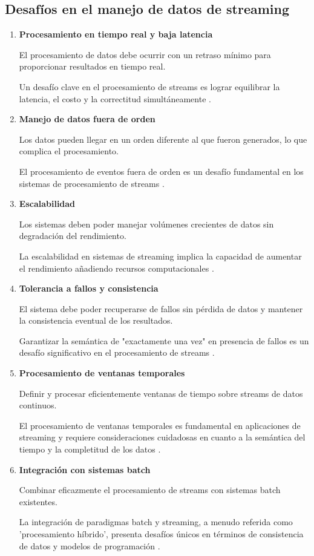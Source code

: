 \subsection{Desafíos en el manejo de datos de streaming}

\begin{enumerate}
    \item \textbf{Procesamiento en tiempo real y baja latencia}
    
    El procesamiento de datos debe ocurrir con un retraso mínimo para proporcionar resultados en tiempo real.
    
    Un desafío clave en el procesamiento de streams es lograr equilibrar la latencia, el costo y la correctitud simultáneamente \parencite{akidau2015dataflow}.

    \item \textbf{Manejo de datos fuera de orden}
    
    Los datos pueden llegar en un orden diferente al que fueron generados, lo que complica el procesamiento.
    
    El procesamiento de eventos fuera de orden es un desafío fundamental en los sistemas de procesamiento de streams \parencite[p.~87]{flink}.

    \item \textbf{Escalabilidad}
    
    Los sistemas deben poder manejar volúmenes crecientes de datos sin degradación del rendimiento.
    
    La escalabilidad en sistemas de streaming implica la capacidad de aumentar el rendimiento añadiendo recursos computacionales \parencite{samurai}.

    \newpage
    \item \textbf{Tolerancia a fallos y consistencia}
    
    El sistema debe poder recuperarse de fallos sin pérdida de datos y mantener la consistencia eventual de los resultados.
    
    Garantizar la semántica de "exactamente una vez" en presencia de fallos es un desafío significativo en el procesamiento de streams \parencite{carbone2015apache}.

    \item \textbf{Procesamiento de ventanas temporales}
    
    Definir y procesar eficientemente ventanas de tiempo sobre streams de datos continuos.
    
    El procesamiento de ventanas temporales es fundamental en aplicaciones de streaming y requiere consideraciones cuidadosas en cuanto a la semántica del tiempo y la completitud de los datos \parencite{akidau2015dataflow}.

    \item \textbf{Integración con sistemas batch}
    
    Combinar eficazmente el procesamiento de streams con sistemas batch existentes.
    
    La integración de paradigmas batch y streaming, a menudo referida como 'procesamiento híbrido', presenta desafíos únicos en términos de consistencia de datos y modelos de programación \parencite{carbone2015apache}.
\end{enumerate}
\newpage

